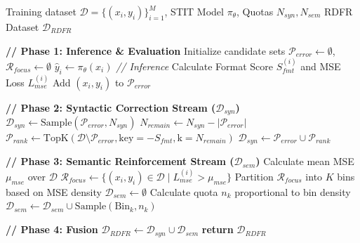 \begin{algorithm}[!ht]
   \caption{Priority-Based Dual-Stream Hard Sample Mining}
   \label{alg:hard_mining}
\begin{algorithmic}
    Training dataset $\mathcal{D} = \{(x_i, y_i)\}_{i=1}^{M}$, STIT Model $\pi_{\theta}$, Quotas $N_{syn}, N_{sem}$
    RDFR Dataset $\mathcal{D}_{RDFR}$

   \STATE \textbf{// Phase 1: Inference \& Evaluation}
   \STATE Initialize candidate sets $\mathcal{P}_{error} \leftarrow \emptyset$, $\mathcal{R}_{focus} \leftarrow \emptyset$
       \STATE $\hat{y}_i \leftarrow \pi_{\theta}(x_i)$ \quad \textit{// Inference}
       \STATE Calculate Format Score $S_{fmt}^{(i)}$ and MSE Loss $L_{mse}^{(i)}$
           \STATE Add $(x_i, y_i)$ to $\mathcal{P}_{error}$
       \ENDIF
   \ENDFOR

   \STATE \textbf{// Phase 2: Syntactic Correction Stream ($\mathcal{D}_{syn}$)}
       \STATE $\mathcal{D}_{syn} \leftarrow \text{Sample}(\mathcal{P}_{error}, N_{syn})$
   \ELSE
       \STATE $N_{remain} \leftarrow N_{syn} - |\mathcal{P}_{error}|$
       \STATE $\mathcal{P}_{rank} \leftarrow \text{TopK}(\mathcal{D} \setminus \mathcal{P}_{error}, \text{key}=-S_{fmt}, \text{k}=N_{remain})$
       \STATE $\mathcal{D}_{syn} \leftarrow \mathcal{P}_{error} \cup \mathcal{P}_{rank}$
   \ENDIF

   \STATE \textbf{// Phase 3: Semantic Reinforcement Stream ($\mathcal{D}_{sem}$)}
   \STATE Calculate mean MSE $\mu_{mse}$ over $\mathcal{D}$
   \STATE $\mathcal{R}_{focus} \leftarrow \{ (x_i, y_i) \in \mathcal{D} \mid L_{mse}^{(i)} > \mu_{mse} \}$
   \STATE Partition $\mathcal{R}_{focus}$ into $K$ bins based on MSE density
   \STATE $\mathcal{D}_{sem} \leftarrow \emptyset$
       \STATE Calculate quota $n_k$ proportional to bin density
       \STATE $\mathcal{D}_{sem} \leftarrow \mathcal{D}_{sem} \cup \text{Sample}(\text{Bin}_k, n_k)$
   \ENDFOR

   \STATE \textbf{// Phase 4: Fusion}
   \STATE $\mathcal{D}_{RDFR} \leftarrow \mathcal{D}_{syn} \cup \mathcal{D}_{sem}$
   \STATE \textbf{return} $\mathcal{D}_{RDFR}$
\end{algorithmic}
\end{algorithm}





